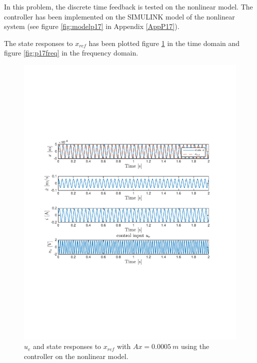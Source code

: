 In this problem, the discrete time feedback is tested on the nonlinear model. The controller has been implemented on the SIMULINK model of the nonlinear system (see figure \ref{fig:modelp17} in Appendix \ref{AppP17}).

The state responses to $x_{ref}$ has been plotted figure \ref{fig:p17time} in the time domain and figure \ref{fig:p17freq} in the frequency domain. 

\begin{figure}[H]
 \centering 
 \includegraphics[trim=0cm 7cm 0cm 7cm, clip=true, totalheight=0.35\textheight, angle=0]{figures/p17time.pdf}
 \caption{$u_e$ and state responses to $x_{ref}$ with $Ax = 0.0005\ m$ using the controller on the nonlinear model.}
 \label{fig:p17time}
\end{figure}

